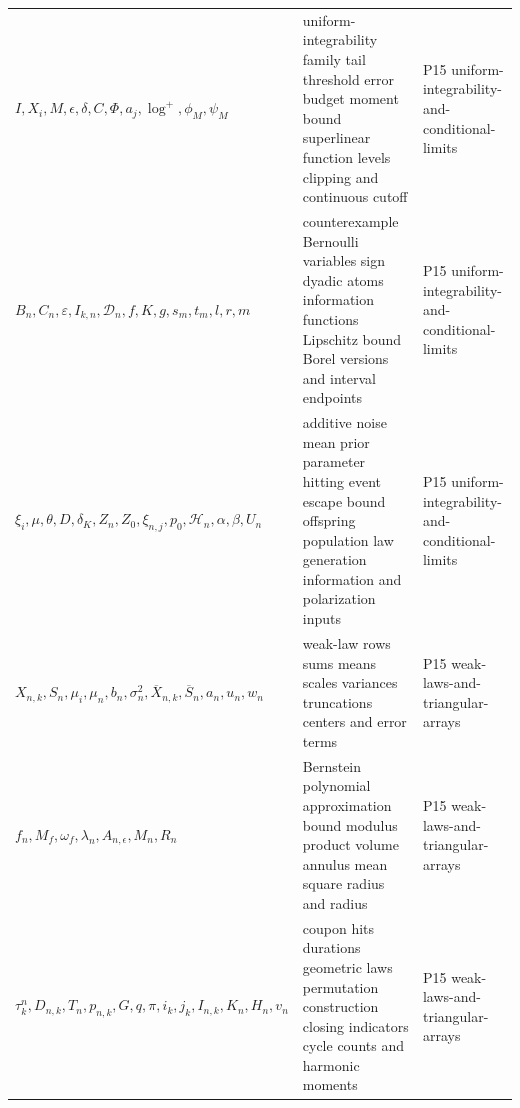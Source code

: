 \begin{longtable}{@{}p{}p{}p{}@{}}
\(I,\allowbreak X_i,\allowbreak M,\allowbreak \epsilon,\allowbreak \delta,\allowbreak C,\allowbreak \Phi,\allowbreak a_j,\allowbreak \log^+,\allowbreak \phi_M,\allowbreak \psi_M\) & uniform-integrability family tail threshold error budget moment bound superlinear function levels clipping and continuous cutoff & P15 uniform-\allowbreak{}integrability-\allowbreak{}and-\allowbreak{}conditional-\allowbreak{}limits \\
\(B_n,\allowbreak C_n,\allowbreak \varepsilon,\allowbreak I_{k,n},\allowbreak \mathcal D_n,\allowbreak f,\allowbreak K,\allowbreak g,\allowbreak s_m,\allowbreak t_m,\allowbreak l,\allowbreak r,\allowbreak m\) & counterexample Bernoulli variables sign dyadic atoms information functions Lipschitz bound Borel versions and interval endpoints & P15 uniform-\allowbreak{}integrability-\allowbreak{}and-\allowbreak{}conditional-\allowbreak{}limits \\
\(\xi_i,\allowbreak \mu,\allowbreak \theta,\allowbreak D,\allowbreak \delta_K,\allowbreak Z_n,\allowbreak Z_0,\allowbreak \xi_{n,j},\allowbreak p_0,\allowbreak \mathcal H_n,\allowbreak \alpha,\allowbreak \beta,\allowbreak U_n\) & additive noise mean prior parameter hitting event escape bound offspring population law generation information and polarization inputs & P15 uniform-\allowbreak{}integrability-\allowbreak{}and-\allowbreak{}conditional-\allowbreak{}limits \\
\(X_{n,k},\allowbreak S_n,\allowbreak \mu_i,\allowbreak \mu_n,\allowbreak b_n,\allowbreak \sigma_n^2,\allowbreak \overline X_{n,k},\allowbreak \overline S_n,\allowbreak a_n,\allowbreak u_n,\allowbreak w_n\) & weak-law rows sums means scales variances truncations centers and error terms & P15 weak-\allowbreak{}laws-\allowbreak{}and-\allowbreak{}triangular-\allowbreak{}arrays \\
\(f_n,\allowbreak M_f,\allowbreak \omega_f,\allowbreak \lambda_n,\allowbreak A_{n,\epsilon},\allowbreak M_n,\allowbreak R_n\) & Bernstein polynomial approximation bound modulus product volume annulus mean square radius and radius & P15 weak-\allowbreak{}laws-\allowbreak{}and-\allowbreak{}triangular-\allowbreak{}arrays \\
\(\tau_k^n,\allowbreak D_{n,k},\allowbreak T_n,\allowbreak p_{n,k},\allowbreak G,\allowbreak q,\allowbreak \pi,\allowbreak i_k,\allowbreak j_k,\allowbreak I_{n,k},\allowbreak K_n,\allowbreak H_n,\allowbreak v_n\) & coupon hits durations geometric laws permutation construction closing indicators cycle counts and harmonic moments & P15 weak-\allowbreak{}laws-\allowbreak{}and-\allowbreak{}triangular-\allowbreak{}arrays \\

\end{longtable}
